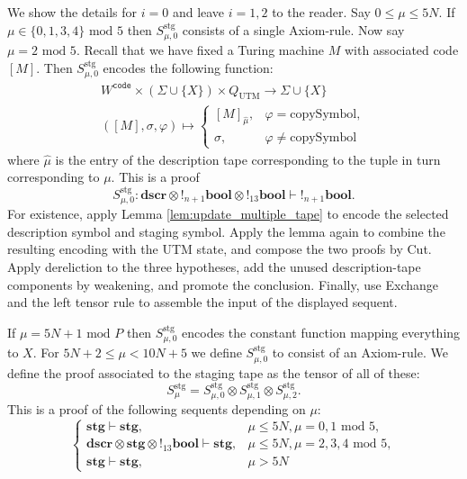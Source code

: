 \documentclass[english,letter paper,12pt,reqno]{article}
\theoremstyle{definition}
\newcommand{\lto}{\longrightarrow}
\begin{document}
We show the details for $i = 0$ and leave $i = 1,2$ to the reader. Say $0 \leq \mu \le 5N$. If $\mu \in \{0,1,3,4\}\text{ mod 5}$ then $S^{\text{stg}}_{\mu, 0}$ consists of a single Axiom-rule. Now say $\mu = 2\text{ mod 5}$. Recall that we have fixed a Turing machine $M$ with associated code $[M]$. Then $S^{\text{stg}}_{\mu,0}$ encodes the following function:
\begin{gather*}
    W^{\texttt{code}} \times (\Sigma \cup \{X\}) \times Q_{\text{UTM}} \lto \Sigma \cup \{X\}\\
    ([M], \sigma, \varphi) \longmapsto
    \begin{cases}
        [M]_{\hat{\mu}},& \varphi = \text{copySymbol},\\
        \sigma,& \varphi \neq \text{copySymbol}
    \end{cases}
\end{gather*}
where $\hat{\mu}$ is the entry of the description tape corresponding to the tuple in turn corresponding to $\mu$. This is a proof
\begin{equation}
    S^{\text{stg}}_{\mu,0}: \textbf{dscr} \otimes {!}{}_{n+1}\textbf{bool} \otimes {!}{}_{13}\textbf{bool} \vdash {!}{}_{n+1}\textbf{bool}.
\end{equation}
For existence, apply Lemma \ref{lem:update_multiple_tape} to encode the selected description symbol and staging symbol. Apply the lemma again to combine the resulting encoding with the UTM state, and compose the two proofs by Cut. Apply dereliction to the three hypotheses, add the unused description-tape components by weakening, and promote the conclusion. Finally, use Exchange and the left tensor rule to assemble the input of the displayed sequent.

If $\mu = 5N+1\text{ mod }P$ then $S^{\text{stg}}_{\mu, 0}$ encodes the constant function mapping everything to $X$. For $5N+2 \leq \mu < 10N+5$ we define $S^{\text{stg}}_{\mu, 0}$ to consist of an Axiom-rule. We define the proof associated to the staging tape as the tensor of all of these:
\begin{equation}
    S^{\text{stg}}_{\mu} = S_{\mu,0}^{\text{stg}} \otimes S_{\mu,1}^{\text{stg}} \otimes S_{\mu,2}^{\text{stg}}.
\end{equation}
This is a proof of the following sequents depending on $\mu$:
\begin{equation}
    \begin{cases}
        \textbf{stg} \vdash \textbf{stg},& \mu \leq 5N, \mu = 0,1\text{ mod }5,\\
        \textbf{dscr} \otimes \textbf{stg} \otimes {!}{}_{13}\textbf{bool} \vdash \textbf{stg},& \mu \leq 5N, \mu = 2,3,4\text{ mod }5,\\
        \textbf{stg} \vdash \textbf{stg},& \mu > 5N
    \end{cases}
\end{equation}
\end{document}
